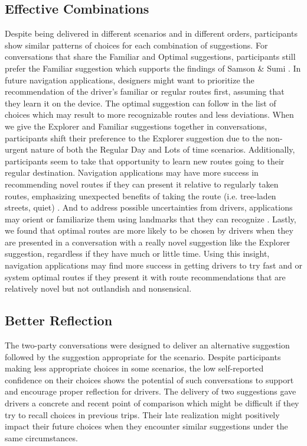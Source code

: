 \subsection{Effective Combinations}
Despite being delivered in different scenarios and in different orders, participants show similar patterns of choices for each combination of suggestions. For conversations that share the Familiar and Optimal suggestions, participants still prefer the Familiar suggestion which supports the findings of 
Samson \& Sumi \cite{Samson:2019:EFI:3290605.3300601}. In future navigation applications, designers might want to prioritize the recommendation of the driver's familiar or regular routes first, assuming that they learn it on the device. The optimal suggestion can follow in the list of choices which may result to more recognizable routes and less deviations. When we give the Explorer and Familiar suggestions together in conversations, participants shift their preference to the Explorer suggestion due to the non-urgent nature of both the Regular Day and Lots of time scenarios. Additionally, participants seem to take that opportunity to learn new routes going to their regular destination. Navigation applications may have more success in recommending novel routes if they can present it relative to regularly taken routes, emphasizing unexpected benefits of taking the route (i.e. tree-laden streets, quiet) \cite{Quercia2014}. And to address possible uncertainties from drivers, applications may orient or familiarize them using landmarks that they can recognize \cite{Antrobus2017Driver-PassengerSystems, Schwering2017}. Lastly, we found that optimal routes are more likely to be chosen by drivers when they are presented in a conversation with a really novel suggestion like the Explorer suggestion, regardless if they have much or little time. Using this insight, navigation applications may find more success in getting drivers to try fast and or system optimal routes \cite{Wijayaratna2017DoesParadox} if they present it with route recommendations that are relatively novel but not outlandish and nonsensical.

\subsection{Better Reflection}
The two-party conversations were designed to deliver an alternative suggestion followed by the suggestion appropriate for the scenario. Despite participants making less appropriate choices in some scenarios, the low self-reported confidence on their choices shows the potential of such conversations to support and encourage proper reflection for drivers. The delivery of two suggestions gave drivers a concrete and recent point of comparison which might be difficult if they try to recall choices in previous trips. Their late realization might positively impact their future choices when they encounter similar suggestions under the same circumstances. 


